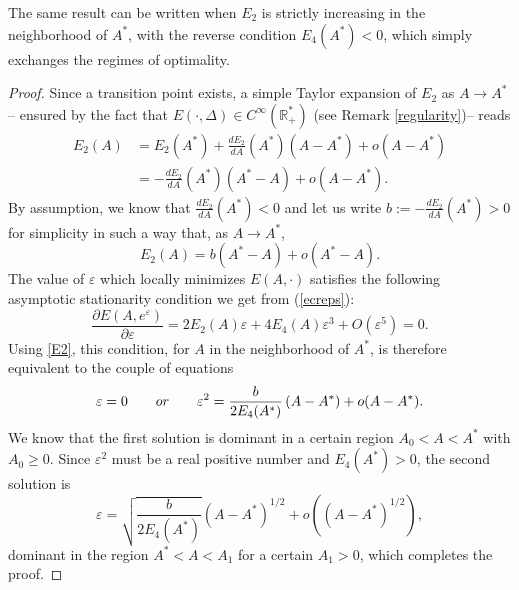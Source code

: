 \documentclass[10pt,a4paper]{amsart}
\newcommand{\R}{\mathbb R}
\begin{document}
\begin{remark}
The same result can be written when $E_2$ is strictly increasing in the neighborhood of $A^*$, with the reverse condition $E_4(A^*)<0$, which simply exchanges the regimes of optimality.
\end{remark}

\begin{proof}
Since a transition point exists, a simple Taylor expansion of $E_2$ as $A\to A^*$ -- ensured by the fact that $E(\cdot,\Delta)\in C^\infty(\R_+^*)$ (see Remark \ref{regularity})-- reads
\begin{align*}
E_2(A)&=E_2(A^*)+\frac{d E_2}{d A}(A^*)(A-A^*)+o(A-A^*)\\
&=-\frac{d E_2}{d A}(A^*)(A^*-A)+o(A-A^*).
\end{align*}
By assumption, we know that $\frac{d E_2}{d A}(A^*)<0$ and let us write $b:=-\frac{d E_2}{d A}(A^*)>0$ for simplicity in such a way that, as $A\to A^*$,
\begin{equation}\label{E2}
E_2(A)=b(A^*-A)+o(A^*-A).
\end{equation}
The value of $\varepsilon$ which locally minimizes $E(A,\cdot)$ satisfies the following asymptotic stationarity condition we get from (\ref{ecreps}):
\begin{equation}\label{crit}
\frac{\partial E(A,e^\varepsilon)}{\partial \varepsilon}
= 2 E_2(A) \varepsilon + 4 E_4(A) \varepsilon^3 + O(\varepsilon^5) = 0 .    
\end{equation}
Using \eqref{E2}, this condition, for $A$ in the neighborhood of $A^*$, is therefore equivalent to the couple of equations
\begin{equation}
\varepsilon = 0 \qquad \textnormal{or} \qquad \varepsilon^2 =
\frac{b}{2 E_4(A^*)} \left( A - A^* \right) +o(A-A^*) .
\end{equation}  
We know that the first solution is dominant in a certain region
$A_0<A<A^*$ with $A_0\ge 0$.
Since $\varepsilon^2$ must be a real positive number and $E_4(A^*)>0$,
the second solution is
\begin{equation} \label{order}
\varepsilon= \sqrt{\frac{b}{2 E_4(A^*)}}
\left( A - A^* \right)^{1/2} +o(\left( A - A^* \right)^{1/2}) ,
\end{equation}  
dominant in the region $A^*<A<A_1$ for a certain $A_1>0$,
which completes the proof.
\end{proof}
\end{document}
